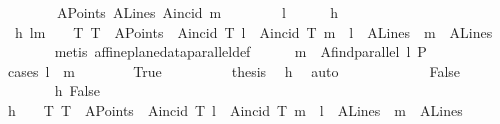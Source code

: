 \begin{isabellebody}
\ \ \ \ \ \ \ \ A{}Points\ A{}Lines\ A{}incid\ m\isanewline
\ \ \ \ \ \ \ \ l{\isachardoublequoteclose}\isanewline
\ \ \ \ \isamarkupfalse%
\ h{}\ \isamarkupfalse%
\ \ h{}{\isacharcolon}{\kern0pt}\ {\isachardoublequoteopen}{\isacharparenleft}{\kern0pt}l{\isacharequal}{\kern0pt}m{\isacharparenright}{\kern0pt}\ {\isasymor}{\isacharparenleft}{\kern0pt}\ {\isacharparenleft}{\kern0pt}{\isasymnot}\ {\isacharparenleft}{\kern0pt}{\isasymexists}\ T{\isachardot}{\kern0pt}\ T\ {\isasymin}\ A{}Points\ {\isasymand}\ A{}incid\ T\ l\ {\isasymand}\ A{}incid\ T\ m{\isacharparenright}{\kern0pt}{\isacharparenright}{\kern0pt}\ {\isasymand}\ {\isacharparenleft}{\kern0pt}l\ {\isasymin}\ A{}Lines{\isacharparenright}{\kern0pt}\ {\isasymand}\ {\isacharparenleft}{\kern0pt}m\ {\isasymin}\ A{}Lines{\isacharparenright}{\kern0pt}{\isacharparenright}{\kern0pt}{\isachardoublequoteclose}\ \isanewline
\ \ \ \ \ \ \isamarkupfalse%
\ {\isacharparenleft}{\kern0pt}metis\ affine{\isacharunderscore}{\kern0pt}plane{\isacharunderscore}{\kern0pt}data{\isachardot}{\kern0pt}parallel{\isacharunderscore}{\kern0pt}def{\isacharparenright}{\kern0pt}\isanewline
\ \ \ \ \isamarkupfalse%
\ {\isachardoublequoteopen}m\ {\isacharequal}{\kern0pt}\ A{}find{\isacharunderscore}{\kern0pt}parallel\ l\ P{\isachardoublequoteclose}\isanewline
\ \ \ \ \isamarkupfalse%
\ {\isacharparenleft}{\kern0pt}cases\ {\isachardoublequoteopen}l\ {\isacharequal}{\kern0pt}\ m{\isachardoublequoteclose}{\isacharparenright}{\kern0pt}\isanewline
\ \ \ \ \ \ \isamarkupfalse%
\ True\isanewline
\ \ \ \ \ \ \isamarkupfalse%
\ \isamarkupfalse%
\ {\isacharquery}{\kern0pt}thesis\ \isamarkupfalse%
\ h{}\ \isamarkupfalse%
\ auto\isanewline
\ \ \ \ \isamarkupfalse%
\isanewline
\ \ \ \ \ \ \isamarkupfalse%
\ False\isanewline
\ \ \ \ \ \ \isamarkupfalse%
\ h{}\ False\ \isamarkupfalse%
\ h{}{\isacharcolon}{\kern0pt}\ {\isachardoublequoteopen}{\isacharparenleft}{\kern0pt}\ {\isacharparenleft}{\kern0pt}{\isasymnot}\ {\isacharparenleft}{\kern0pt}{\isasymexists}\ T{\isachardot}{\kern0pt}\ T\ {\isasymin}\ A{}Points\ {\isasymand}\ A{}incid\ T\ l\ {\isasymand}\ A{}incid\ T\ m{\isacharparenright}{\kern0pt}{\isacharparenright}{\kern0pt}\ {\isasymand}\ {\isacharparenleft}{\kern0pt}l\ {\isasymin}\ A{}Lines{\isacharparenright}{\kern0pt}\ {\isasymand}\ {\isacharparenleft}{\kern0pt}m\ {\isasymin}\ A{}Lines{\isacharparenright}{\kern0pt}{\isacharparenright}{\kern0pt}{\isachardoublequoteclose}\ \isamarkupfalse%

\end{isabellebody}
